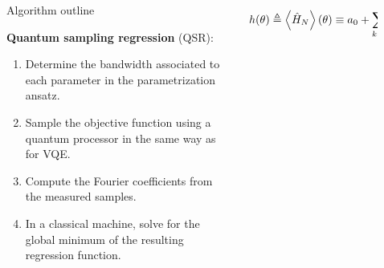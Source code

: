 \documentclass[final]{beamer}
\newlength{\sepwid}
\newlength{\onecolwid}
\newlength{\twocolwid}
\begin{document}
\begin{frame}[t]
\begin{columns}[t]
\begin{column}{\onecolwid}
\end{column} %
\begin{column}{\sepwid}\end{column} %
\begin{column}{\twocolwid} %
\begin{columns}[t,totalwidth=\twocolwid] %
\begin{column}{\onecolwid}\vspace{-.6in} %


\begin{block}{Algorithm outline}

  \textbf{Quantum sampling regression} (QSR):

  \begin{enumerate}
    \item Determine the bandwidth associated to each parameter in the parametrization ansatz.
    \item Sample the objective function using a quantum processor in the same way as for VQE.
    \item Compute the Fourier coefficients from the measured samples.
    \item In a classical machine, solve for the global minimum of the resulting regression function.
  \end{enumerate}

\end{block}


\end{column} %
\begin{column}{\onecolwid}\vspace{-.6in} %


\vspace{-1em}
\begin{gather*}
  h(\theta) \defeq \ev{\hat{H}_{N}}\qty(\theta) \equiv a_0 + \sum_{k=1}^S \qty[a_k\cos(k\theta) + b_k\sin(k\theta)]
\end{gather*}


\end{column}
\end{columns}
\end{column}
\end{columns}
\end{frame}
\end{document}
